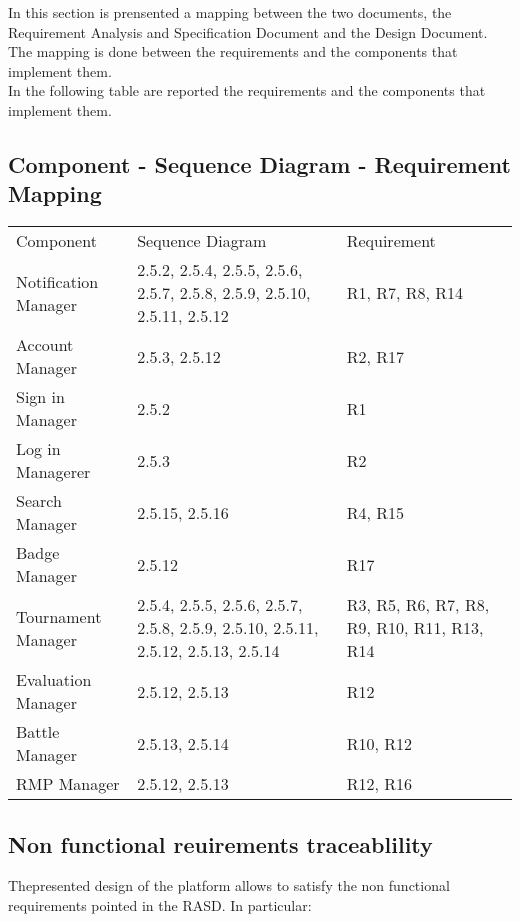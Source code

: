 In this section is prensented a mapping between the two documents, the Requirement Analysis and Specification Document and the Design Document. The mapping is done between the requirements and the components that implement them.\\
In the following table are reported the requirements and the components that implement them.
\subsection{Component - Sequence Diagram - Requirement Mapping} \label{uc:mapping}
\begin{center}
    \begin{tabu}{|X[.25]|X[.4]|X[.2]|} \hline \everyrow{\hline}
        Component & Sequence Diagram & Requirement \\
        Notification Manager & 2.5.2, 2.5.4, 2.5.5, 2.5.6, 2.5.7, 2.5.8, 2.5.9, 2.5.10, 2.5.11, 2.5.12  & R1, R7, R8, R14\\ 
        Account Manager & 2.5.3, 2.5.12  & R2, R17\\
        Sign in Manager & 2.5.2 & R1\\
        Log in Managerer & 2.5.3 & R2\\
        Search Manager & 2.5.15, 2.5.16& R4, R15\\
        Badge Manager & 2.5.12 & R17\\
        Tournament Manager & 2.5.4, 2.5.5, 2.5.6, 2.5.7, 2.5.8, 2.5.9, 2.5.10, 2.5.11, 2.5.12, 2.5.13, 2.5.14 & R3, R5, R6, R7, R8, R9, R10, R11, R13, R14\\
        Evaluation Manager & 2.5.12, 2.5.13 & R12\\
        Battle Manager & 2.5.13, 2.5.14 & R10, R12\\
        RMP Manager & 2.5.12, 2.5.13 & R12, R16\\
    \end{tabu}
\end{center}

\subsection{Non functional reuirements traceablility}
Thepresented design of the platform allows to satisfy the non functional requirements pointed in the RASD. In particular:
